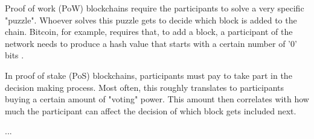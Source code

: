 Proof of work (PoW) blockchains require the participants to solve a very
specific "puzzle". Whoever solves this puzzle gets to decide which
block is added to the chain. Bitcoin, for example, requires that, to
add a block, a participant of the network needs to produce a hash
value that starts with a certain number of '0' bits
\cite{nakamoto2008bitcoin}. 

In proof of stake (PoS) blockchains, participants must pay to take
part in the decision making process. Most often, this roughly
translates to participants buying a certain amount of "voting" power.
This amount then correlates with how much the participant can affect
the decision of which block gets included next.

...

